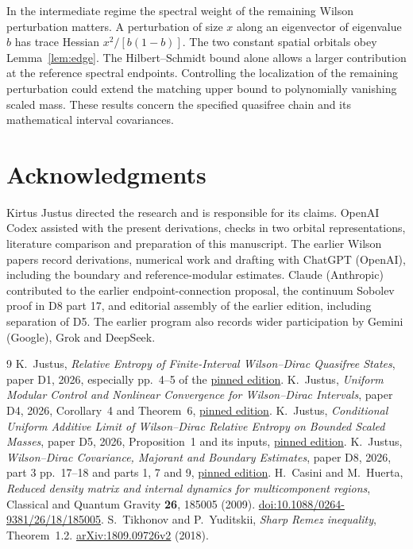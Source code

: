 \documentclass[11pt,letterpaper]{article}
\newcommand{\edition}{\href{https://github.com/KirtusJ/From-Prephysical-Hypotheses-to-Physical-Models/tree/0ca75f60c76af1be7f3c25c2ed8914e82243ff5d/edition/PAPERS}{pinned edition}}
\begin{document}
In the intermediate regime the spectral weight of the remaining Wilson perturbation matters. A perturbation of size \(x\) along an eigenvector of eigenvalue \(b\) has trace Hessian \(x^2/[b(1-b)]\). The two constant spatial orbitals obey Lemma~\ref{lem:edge}. The Hilbert--Schmidt bound alone allows a larger contribution at the reference spectral endpoints. Controlling the localization of the remaining perturbation could extend the matching upper bound to polynomially vanishing scaled mass. These results concern the specified quasifree chain and its mathematical interval covariances.

\section*{Acknowledgments}
Kirtus Justus directed the research and is responsible for its claims. OpenAI Codex assisted with the present derivations, checks in two orbital representations, literature comparison and preparation of this manuscript. The earlier Wilson papers record derivations, numerical work and drafting with ChatGPT (OpenAI), including the boundary and reference-modular estimates. Claude (Anthropic) contributed to the earlier endpoint-connection proposal, the continuum Sobolev proof in D8 part 17, and editorial assembly of the earlier edition, including separation of D5. The earlier program also records wider participation by Gemini (Google), Grok and DeepSeek.

\begin{thebibliography}{9}\small
{} K.~Justus, \emph{Relative Entropy of Finite-Interval Wilson--Dirac Quasifree States}, paper D1, 2026, especially pp.~4--5 of the \edition.
 K.~Justus, \emph{Uniform Modular Control and Nonlinear Convergence for Wilson--Dirac Intervals}, paper D4, 2026, Corollary~4 and Theorem~6, \edition.
 K.~Justus, \emph{Conditional Uniform Additive Limit of Wilson--Dirac Relative Entropy on Bounded Scaled Masses}, paper D5, 2026, Proposition~1 and its inputs, \edition.
 K.~Justus, \emph{Wilson--Dirac Covariance, Majorant and Boundary Estimates}, paper D8, 2026, part 3 pp.~17--18 and parts 1, 7 and 9, \edition.
 H.~Casini and M.~Huerta, \emph{Reduced density matrix and internal dynamics for multicomponent regions}, Classical and Quantum Gravity \textbf{26}, 185005 (2009).
\href{https://doi.org/10.1088/0264-9381/26/18/185005}{doi:10.1088/0264-9381/26/18/185005}.
 S.~Tikhonov and P.~Yuditskii, \emph{Sharp Remez inequality}, Theorem~1.2.
\href{https://arxiv.org/abs/1809.09726v2}{arXiv:1809.09726v2} (2018).
\end{thebibliography}
\end{document}
